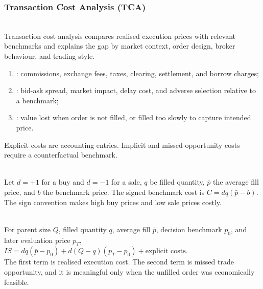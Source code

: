 \subsubsection{Transaction Cost Analysis (TCA)}

\begin{definition} \\
Transaction cost analysis compares realised execution prices with relevant benchmarks and explains the gap by market context, order design, broker behaviour, and trading style.
\end{definition}

\begin{taxonomy} 
\begin{enumerate}[label=\roman*.]
\setlength{\itemsep}{0pt}
\item {}: commissions, exchange fees, taxes, clearing, settlement, and borrow charges;
\item {}: bid-ask spread, market impact, delay cost, and adverse selection relative to a benchmark;
\item {}: value lost when order is not filled, or filled too slowly to capture intended price.
\end{enumerate}
Explicit costs are accounting entries. Implicit and missed-opportunity costs require a counterfactual benchmark.
\end{taxonomy}

\begin{model} \\
Let $d=+1$ for a buy and $d=-1$ for a sale, $q$ be filled quantity, $\bar{p}$ the average fill price, and $b$ the benchmark price. The signed benchmark cost is $C=dq(\bar{p}-b)$.\\
The sign convention makes high buy prices and low sale prices costly.
\end{model}

\begin{model} \\
For parent size $Q$, filled quantity $q$, average fill $\bar{p}$, decision benchmark $p_0$, and later evaluation price  $p_T$,\\
$IS=dq(\bar{p}-p_0)+d(Q-q)(p_T-p_0)+\text{explicit costs}$.\\
The first term is realised execution cost. The second term is missed trade opportunity, and it is meaningful only when the unfilled order was economically feasible.
\end{model}

